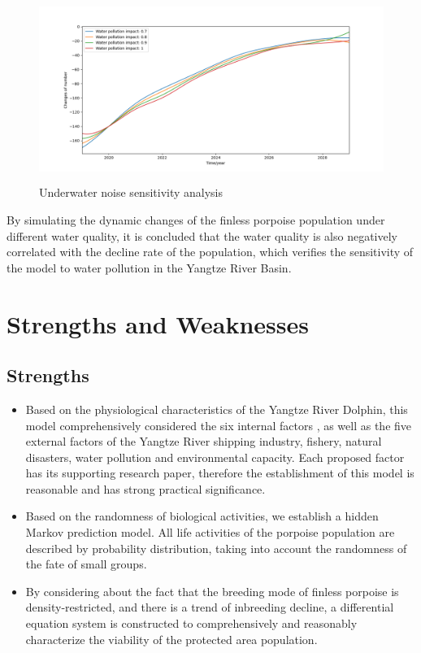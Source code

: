 \documentclass[12pt]{article}  %
\begin{document}
\begin{figure}[htbp]%
	\small
	\centering
	\includegraphics[height=6cm,width=12cm]{figures/watp.png}%
	\caption{Underwater noise sensitivity analysis} %
\end{figure}

By simulating the dynamic changes of the finless porpoise population under different water quality, it is concluded that the water quality is also negatively correlated with the decline rate of the population, which verifies the sensitivity of the model to water pollution in the Yangtze River Basin.

\section{Strengths and Weaknesses}
\subsection{Strengths}
\begin{itemize}
    \item Based on the physiological characteristics of the Yangtze River Dolphin, this model comprehensively considered the six internal factors , as well as the five external factors of the Yangtze River shipping industry, fishery, natural disasters, water pollution and environmental capacity. Each proposed factor has its supporting research paper, therefore the establishment of this model is reasonable and has strong practical significance.
    \item Based on the randomness of biological activities, we establish a hidden Markov prediction model.
    All life activities of the porpoise population are described by probability distribution, taking into account the randomness of the fate of small groups. 
    \item By considering about the fact that the breeding mode of finless porpoise is density-restricted, and there is a trend of inbreeding decline, a differential equation system is constructed to comprehensively and reasonably characterize the viability of the protected area population.
\end{itemize}
\end{document}
